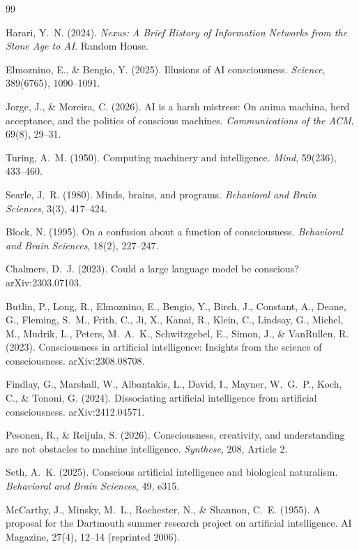 \documentclass[10pt]{article}
\begin{document}
\begin{thebibliography}{99}\small

Harari, Y.~N. (2024).
\emph{Nexus: A Brief History of Information Networks from the Stone Age to AI}.
Random House.

Elmoznino, E., \& Bengio, Y. (2025).
Illusions of AI consciousness.
\emph{Science}, 389(6765), 1090--1091.

Jorge, J., \& Moreira, C. (2026).
AI is a harsh mistress: On anima machina, herd acceptance, and the politics of conscious machines.
\emph{Communications of the ACM}, 69(8), 29--31.

Turing, A.~M. (1950).
Computing machinery and intelligence.
\emph{Mind}, 59(236), 433--460.

Searle, J.~R. (1980).
Minds, brains, and programs.
\emph{Behavioral and Brain Sciences}, 3(3), 417--424.

Block, N. (1995).
On a confusion about a function of consciousness.
\emph{Behavioral and Brain Sciences}, 18(2), 227--247.

Chalmers, D.~J. (2023).
Could a large language model be conscious?
arXiv:2303.07103.

Butlin, P., Long, R., Elmoznino, E., Bengio, Y., Birch, J., Constant, A., Deane, G., Fleming, S.~M., Frith, C., Ji, X., Kanai, R., Klein, C., Lindsay, G., Michel, M., Mudrik, L., Peters, M.~A.~K., Schwitzgebel, E., Simon, J., \& VanRullen, R. (2023).
Consciousness in artificial intelligence: Insights from the science of consciousness.
arXiv:2308.08708.

Findlay, G., Marshall, W., Albantakis, L., David, I., Mayner, W.~G.~P., Koch, C., \& Tononi, G. (2024).
Dissociating artificial intelligence from artificial consciousness.
arXiv:2412.04571.

Pesonen, R., \& Reijula, S. (2026).
Consciousness, creativity, and understanding are not obstacles to machine intelligence.
\emph{Synthese}, 208, Article 2.

Seth, A.~K. (2025).
Conscious artificial intelligence and biological naturalism.
\emph{Behavioral and Brain Sciences}, 49, e315.

McCarthy, J., Minsky, M.~L., Rochester, N., \& Shannon, C.~E. (1955).
A proposal for the Dartmouth summer research project on artificial intelligence.
AI Magazine, 27(4), 12--14 (reprinted 2006).


\end{thebibliography}
\end{document}
